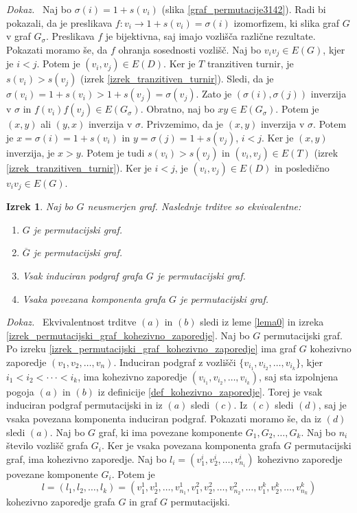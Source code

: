 \documentclass[a4paper, 12pt]{book}
\newtheorem{izrek}{Izrek}[chapter]
\newenvironment{dokaz}{\emph{Dokaz.}\ }{\hspace{\fill}{$\Box$}}
\begin{document}
\begin{dokaz}
    Naj bo $\sigma(i) = 1 + s(v_i)$ (slika \ref{graf_permutacije3142}). Radi bi pokazali, da je preslikava $f: v_i \rightarrow 1 + s(v_i) = \sigma(i)$ izomorfizem, ki slika graf $G$ v graf $G_{\sigma}$. Preslikava $f$ je bijektivna, saj imajo vozlišča različne rezultate. Pokazati moramo še, da $f$ ohranja sosednosti vozlišč. Naj bo $v_iv_j \in E(G)$, kjer je $i < j$. Potem je $(v_i, v_j) \in E(D)$. Ker je $T$ tranzitiven turnir, je $s(v_i) > s(v_j)$ (izrek \ref{izrek_tranzitiven_turnir}). Sledi, da je $\sigma(v_i) = 1 + s(v_i) > 1 + s(v_j) = \sigma(v_j)$. Zato je $(\sigma(i), \sigma(j))$ inverzija v $\sigma$ in $f(v_i)f(v_j) \in E(G_{\sigma})$. Obratno, naj bo $xy \in E(G_{\sigma})$. Potem je $(x, y)$ ali $(y, x)$ inverzija v $\sigma$. Privzemimo, da je $(x, y)$ inverzija v $\sigma$. Potem je $x = \sigma(i) = 1 + s(v_i)$ in $y = \sigma(j) = 1 + s(v_j)$, $i < j$. Ker je $(x, y)$ inverzija, je $x > y$. Potem je tudi $s(v_i) > s(v_j)$ in $(v_i, v_j) \in E(T)$ (izrek \ref{izrek_tranzitiven_turnir}). Ker je $i < j$, je $(v_i, v_j) \in E(D)$ in posledično $v_iv_j \in E(G)$.
\end{dokaz}


\begin{izrek}
\label{izrek_ekvivalentne_trditve_permutacijski_graf}
    Naj bo $G$ neusmerjen graf. Naslednje trditve so ekvivalentne:
    \begin{enumerate}[label=(\alph*)]
        \item $G$ je permutacijski graf.
        \item $\overline{G}$ je permutacijski graf.
        \item Vsak induciran podgraf grafa $G$ je permutacijski graf.
        \item Vsaka povezana komponenta grafa $G$ je permutacijski graf.
    \end{enumerate}
\end{izrek}
\begin{dokaz}
    Ekvivalentnost trditve $(a)$ in $(b)$ sledi iz leme \ref{lema0} in izreka \ref{izrek_permutacijski_graf_kohezivno_zaporedje}. Naj bo $G$ permutacijski graf. Po izreku \ref{izrek_permutacijski_graf_kohezivno_zaporedje} ima graf $G$ kohezivno zaporedje $(v_1, v_2, \dots, v_n)$. Induciran podgraf z vozlišči $\{ v_{i_1}, v_{i_2}, \dots, v_{i_k} \}$, kjer $i_1 < i_2 < \cdot\cdot\cdot < i_k$, ima kohezivno zaporedje $(v_{i_1}, v_{i_2}, \dots, v_{i_k})$, saj sta izpolnjena pogoja $(a)$ in $(b)$ iz definicije \ref{def_kohezivno_zaporedje}. Torej je vsak induciran podgraf permutacijski in iz $(a)$ sledi $(c)$. Iz $(c)$ sledi $(d)$, saj je vsaka povezana komponenta induciran podgraf. Pokazati moramo še, da iz $(d)$ sledi $(a)$. Naj bo $G$ graf, ki ima povezane komponente $G_1, G_2, \dots, G_k$. Naj bo $n_i$ število vozlišč grafa $G_i$. Ker je vsaka povezana komponenta grafa $G$ permutacijski graf, ima kohezivno zaporedje. Naj bo $l_i = (v_1^i, v_2^i, \dots, v_{n_i}^i)$ kohezivno zaporedje povezane komponente $G_i$. Potem je 
    \[
        l = (l_1, l_2, \dots, l_k) = (v_1^1, v_2^1, \dots, v_{n_1}^1, v_1^2, v_2^2, \dots, v_{n_2}^2, \dots, v_1^k, v_2^k, \dots, v_{n_k}^k)
    \]
    kohezivno zaporedje grafa $G$ in graf $G$ permutacijski. 
\end{dokaz}
\end{document}
